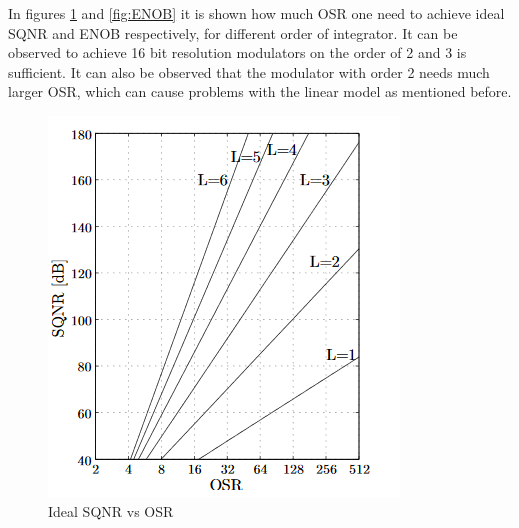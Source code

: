 In figures \ref{fig:SQNR} and \ref{fig:ENOB} it is shown how much OSR one need to achieve ideal SQNR and ENOB respectively, for different order of integrator. It can be observed to achieve 16 bit resolution modulators on the order of 2 and 3 is sufficient. It can also be observed that the modulator with order 2 needs much larger OSR, which can cause problems with the linear model as mentioned before.

\begin{figure}
\begin{minipage}[c]{0.5\linewidth}
\includegraphics[width=\linewidth]{images/OSR_vs_SQNR.png}
\caption{Ideal SQNR vs OSR\cite{SQNR}}
\label{fig:SQNR}
\end{minipage}
\hfill
\begin{minipage}[c]{0.5\linewidth}%

\end{minipage}
\end{figure}
